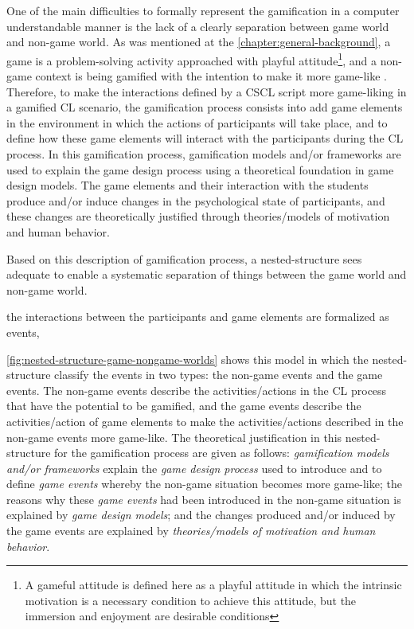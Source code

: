 One of the main difficulties to formally represent the gamification in a computer understandable manner is the lack of a clearly separation between game world and non-game world. As was mentioned at the \autoref{chapter:general-background}, a game is a problem-solving activity approached with playful attitude\footnote{A gameful attitude is defined here as a playful attitude in which the intrinsic motivation is a necessary condition to achieve this attitude, but the immersion and enjoyment are desirable conditions}\cite{Schell2008}, and a non-game context is being gamified with the intention to make it more game-like \cite{Werbach2014}. Therefore, to make the interactions defined by a CSCL script more game-liking in a gamified CL scenario, the gamification process consists into add game elements in the environment in which the actions of participants will take place, and to define how these game elements will interact with the participants during the CL process. In this gamification process, gamification models and/or frameworks are used to explain the game design process using a theoretical foundation in game design models. The game elements and their interaction with the students produce and/or induce changes in the psychological state of participants, and these changes are theoretically justified through theories/models of motivation and human behavior.

Based on this description of gamification process, a nested-structure sees adequate to enable a systematic separation of things between  the game world and non-game world.

the interactions between the participants and game elements are formalized as events, 

 \autoref{fig:nested-structure-game-nongame-worlds} shows this model in which the nested-structure classify the events in two types: the non-game events and the game events. The non-game events describe the activities/actions in the CL process that have the potential to be gamified, and the game events describe the activities/action of game elements to make the activities/actions described in the non-game events more game-like. The theoretical justification in this nested-structure for the gamification process are given as follows: \emph{gamification models and/or frameworks} explain the \emph{game design process} used to introduce and to define \emph{game events} whereby the non-game situation becomes more game-like; the reasons why these \emph{game events} had been introduced in the non-game situation is explained by \emph{game design models}; and the changes produced and/or induced by the game events are explained by \emph{theories/models of motivation and human behavior}. 

